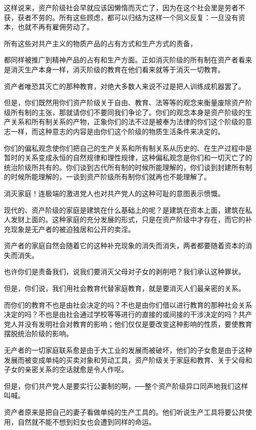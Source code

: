 \documentclass[UTF8]{ctexart}
\begin{document}
这样说来，资产阶级社会早就应该因懒惰而灭亡了，因为在这个社会里是劳者不获，获者不劳的。所有这些顾虑，都可以归结为这样一个同义反复：一旦没有资本，也就不再有雇佣劳动了。

所有这些对共产主义的物质产品的占有方式和生产方式的责备，

都同样被推广到精神产品的占有和生产方面。正如消灭阶级的所有制在资产者看来是消灭生产本身一样，消灭阶级的教育在他们看来就等于消灭一切教育。

资产者唯恐其灭亡的那种教育，对绝大多数人来说不过是把人训练成机器罢了。

但是，你们既然用你们资产阶级关于自由、教育、法等等的观念来衡量废除资产阶级所有制的主张，那就请你们不要同我们争论了。你们的观念本身是资产阶级的生产关系和所有制关系的产物，正象你们的法不过是被奉为法律的你们这个阶级的意志一样，而这种意志的内容是由你们这个阶级的物质生活条件来决定的。

你们的偏私观念使你们把自己的生产关系和所有制关系从历史的、在生产过程中是暂时的关系变成永恒的自然规律和理性规律，这种偏私观念是你们和一切灭亡了的统治阶级所共有的。你们谈到古代所有制的时候所能理解的，你们谈到封建所有制的时候所能理解的，一谈到资产阶级所有制你们就再也不能理解了。

消灭家庭！连极端的激进党人也对共产党人的这种可耻的意图表示愤慨。

现代的、资产阶级的家庭是建筑在什么基础上的呢？是建筑在资本上面，建筑在私人发财上面的。这种家庭的充分发展的形式，只是在资产阶级中才存在，而它的补充现象是无产者的被迫独居和公开的卖淫。

资产者的家庭自然会随着它的这种补充现象的消失而消失，两者都要随着资本的消失而消失。

也许你们是责备我们，说我们要消灭父母对子女的剥削吧？我们承认这种罪状。

但是，你们说，我们用社会教育代替家庭教育，就是要消灭人们最亲密的关系。

而你们的教育不也是由社会决定的吗？不也是由你们借以进行教育的那种社会关系决定的吗？不也是由社会通过学校等等进行的直接的或间接的干涉决定的吗？共产党人并没有发明社会对教育的影响；他们仅仅是要改变这种影响的性质，要使教育摆脱统治阶级的影响。

无产者的一切家庭联系愈是由于大工业的发展而被破坏，他们的子女愈是由于这种发展而被变成单纯的买卖对象和劳动工具，资产阶级关于家庭和教育、关于父母和子女的亲密关系的空话就愈是令人作呕。

但是，你们共产党人是要实行公妻制的啊，──整个资产阶级异口同声地我们这样叫喊。

资产者原来是把自己的妻子看做单纯的生产工具的。他们听说生产工具将要公共使用，自然就不能不想到妇女也会遭到同样的命运。
\end{document}
